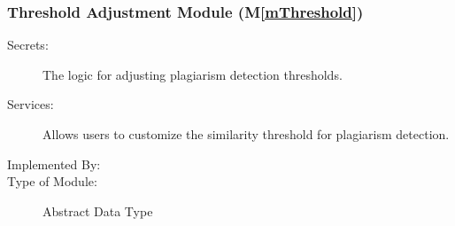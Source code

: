 \documentclass[12pt, titlepage]{article}
\newcommand{\mref}[1]{M\ref{#1}}
\begin{document}
\subsubsection{Threshold Adjustment Module (\mref{mThreshold})}

\begin{description}
\item[Secrets:] The logic for adjusting plagiarism detection thresholds.
\item[Services:] Allows users to customize the similarity threshold for plagiarism detection.
\item[Implemented By:] \progname{}
\item[Type of Module:] Abstract Data Type
\end{description}





\end{document}
